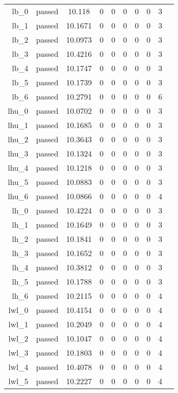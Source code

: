 \begin{longtable}{r|ccccccccc}
    lb\_0 & passed & 10.118 & 0 & 0 & 0 & 0 & 0 & 3 \\
    lb\_1 & passed & 10.1671 & 0 & 0 & 0 & 0 & 0 & 3 \\
    lb\_2 & passed & 10.0973 & 0 & 0 & 0 & 0 & 0 & 3 \\
    lb\_3 & passed & 10.4216 & 0 & 0 & 0 & 0 & 0 & 3 \\
    lb\_4 & passed & 10.1747 & 0 & 0 & 0 & 0 & 0 & 3 \\
    lb\_5 & passed & 10.1739 & 0 & 0 & 0 & 0 & 0 & 3 \\
    lb\_6 & passed & 10.2791 & 0 & 0 & 0 & 0 & 0 & 6 \\
    lhu\_0 & passed & 10.0702 & 0 & 0 & 0 & 0 & 0 & 3 \\
    lhu\_1 & passed & 10.1685 & 0 & 0 & 0 & 0 & 0 & 3 \\
    lhu\_2 & passed & 10.3643 & 0 & 0 & 0 & 0 & 0 & 3 \\
    lhu\_3 & passed & 10.1324 & 0 & 0 & 0 & 0 & 0 & 3 \\
    lhu\_4 & passed & 10.1218 & 0 & 0 & 0 & 0 & 0 & 3 \\
    lhu\_5 & passed & 10.0883 & 0 & 0 & 0 & 0 & 0 & 3 \\
    lhu\_6 & passed & 10.0866 & 0 & 0 & 0 & 0 & 0 & 4 \\
    lh\_0 & passed & 10.4224 & 0 & 0 & 0 & 0 & 0 & 3 \\
    lh\_1 & passed & 10.1649 & 0 & 0 & 0 & 0 & 0 & 3 \\
    lh\_2 & passed & 10.1841 & 0 & 0 & 0 & 0 & 0 & 3 \\
    lh\_3 & passed & 10.1652 & 0 & 0 & 0 & 0 & 0 & 3 \\
    lh\_4 & passed & 10.3812 & 0 & 0 & 0 & 0 & 0 & 3 \\
    lh\_5 & passed & 10.1788 & 0 & 0 & 0 & 0 & 0 & 3 \\
    lh\_6 & passed & 10.2115 & 0 & 0 & 0 & 0 & 0 & 4 \\
    lwl\_0 & passed & 10.4154 & 0 & 0 & 0 & 0 & 0 & 4 \\
    lwl\_1 & passed & 10.2049 & 0 & 0 & 0 & 0 & 0 & 4 \\
    lwl\_2 & passed & 10.1047 & 0 & 0 & 0 & 0 & 0 & 4 \\
    lwl\_3 & passed & 10.1803 & 0 & 0 & 0 & 0 & 0 & 4 \\
    lwl\_4 & passed & 10.4078 & 0 & 0 & 0 & 0 & 0 & 4 \\
    lwl\_5 & passed & 10.2227 & 0 & 0 & 0 & 0 & 0 & 4 \\

\end{longtable}
